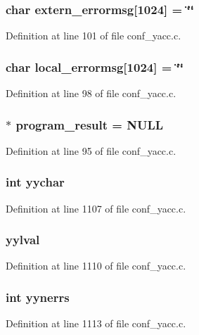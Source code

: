 \subsubsection[{extern\_\-errormsg}]{\setlength{\rightskip}{0pt plus 5cm}char {\bf extern\_\-errormsg}[1024] = \char`\"{}\char`\"{}}\label{conf__yacc_8c_ac80358e39707c0c4c3f489380b86e4fb}


Definition at line 101 of file conf\_\-yacc.c.
\subsubsection[{local\_\-errormsg}]{\setlength{\rightskip}{0pt plus 5cm}char {\bf local\_\-errormsg}[1024] = \char`\"{}\char`\"{}}\label{conf__yacc_8c_a8b1ec6ad5bb54bdc896259e22311dbfa}


Definition at line 98 of file conf\_\-yacc.c.
\subsubsection[{program\_\-result}]{$\ast$ {\bf program\_\-result} = NULL}\label{conf__yacc_8c_a538cfb02bc69bba6c1b09fd1eadbe58b}


Definition at line 95 of file conf\_\-yacc.c.
\subsubsection[{yychar}]{\setlength{\rightskip}{0pt plus 5cm}int {\bf yychar}}\label{conf__yacc_8c_a9e2c7c7373b818c86b2df7106a92327c}


Definition at line 1107 of file conf\_\-yacc.c.
\subsubsection[{yylval}]{ {\bf yylval}}\label{conf__yacc_8c_a539b86ee4bb46824a194f22eb69903d9}


Definition at line 1110 of file conf\_\-yacc.c.
\subsubsection[{yynerrs}]{\setlength{\rightskip}{0pt plus 5cm}int {\bf yynerrs}}\label{conf__yacc_8c_a0ea9e3b522e448ac462274fe70e1be82}


Definition at line 1113 of file conf\_\-yacc.c.